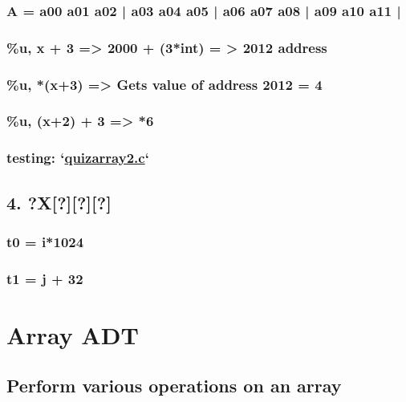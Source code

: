 \documentclass{article}
\begin{document}
\subsubsection{A = a00 a01 a02 | a03 a04 a05 | a06 a07 a08 | a09 a10 a11 |}
\label{sec:orgd26a38c}

\subsubsection{\%u, x + 3 => 2000 + (3*int) = > \textbf{2012 address}}
\label{sec:orgb3ce56b}

\subsubsection{\%u, *(x+3) => Gets value of address 2012  =  4}
\label{sec:org1267dcd}

\subsubsection{\%u, \textbf{(x+2) + 3 => *6}}
\label{sec:org7bf7728}
\subsubsection{testing: `\url{quizarray2.c}`}
\label{sec:org9917b76}

\subsection{4. ?X[?][?][?]}
\label{sec:org61f92d4}

\subsubsection{t0 = i*1024}
\label{sec:org321cd87}

\subsubsection{t1 = j + 32}
\label{sec:org6c641b6}





\section{Array ADT}
\label{sec:orgcb40b3f}
\subsection{Perform various operations on an array}
\label{sec:org0cacd38}
\end{document}
